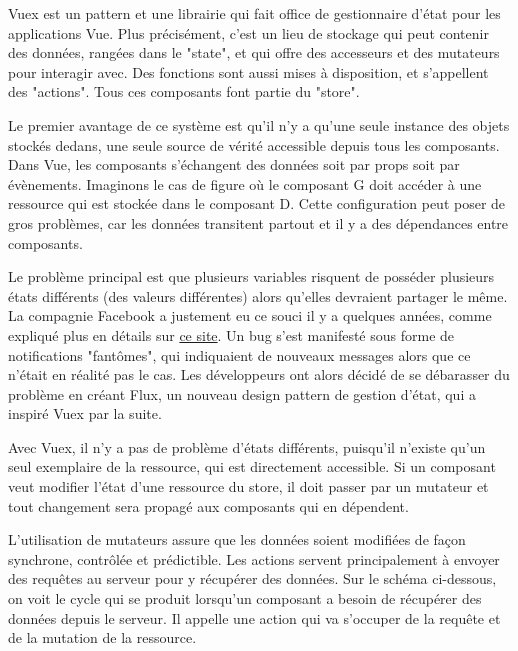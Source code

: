 \documentclass[
    iai, %
    eai, %
]{heig-tb}
\begin{document}
Vuex est un pattern et une librairie qui fait office de gestionnaire d'état pour les applications Vue.
Plus précisément, c'est un lieu de stockage qui peut contenir des données, rangées dans le "state", et qui offre des accesseurs et des mutateurs pour interagir avec.
Des fonctions sont aussi mises à disposition, et s'appellent des "actions". Tous ces composants font partie du "store".

Le premier avantage de ce système est qu'il n'y a qu'une seule instance des objets stockés dedans, une seule source de vérité accessible depuis tous les composants.
Dans Vue, les composants s'échangent des données soit par props soit par évènements.
Imaginons le cas de figure où le composant G doit accéder à une ressource qui est stockée dans le composant D.
Cette configuration peut poser de gros problèmes, car les données transitent partout et il y a des dépendances entre composants.

\newpage
{}

Le problème principal est que plusieurs variables risquent de posséder plusieurs états différents (des valeurs différentes) alors qu'elles devraient partager le même.
La compagnie Facebook a justement eu ce souci il y a quelques années, comme expliqué plus en détails sur \href{https://code-cartoons.com/a-cartoon-guide-to-flux-6157355ab207}{ce site}.
Un bug s'est manifesté sous forme de notifications "fantômes", qui indiquaient de nouveaux messages alors que ce n'était en réalité pas le cas.
Les développeurs ont alors décidé de se débarasser du problème en créant Flux, un nouveau design pattern de gestion d'état, qui a inspiré Vuex par la suite.


Avec Vuex, il n'y a pas de problème d'états différents, puisqu'il n'existe qu'un seul exemplaire de la ressource, qui est directement accessible.
Si un composant veut modifier l'état d'une ressource du store, il doit passer par un mutateur et tout changement sera propagé aux composants qui en dépendent.

\newpage
L'utilisation de mutateurs assure que les données soient modifiées de façon synchrone, contrôlée et prédictible.
Les actions servent principalement à envoyer des requêtes au serveur pour y récupérer des données.
Sur le schéma ci-dessous, on voit le cycle qui se produit lorsqu'un composant a besoin de récupérer des données depuis le serveur.
Il appelle une action qui va s'occuper de la requête et de la mutation de la ressource.
\end{document}
